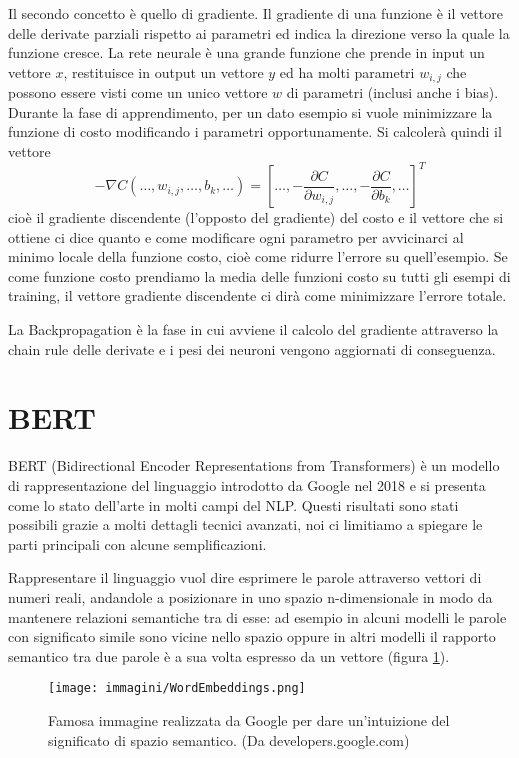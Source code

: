 \documentclass[12pt]{report}
\begin{document}
Il secondo concetto è quello di gradiente. Il gradiente di una funzione è il vettore delle derivate parziali rispetto ai parametri ed indica la direzione verso la quale la funzione cresce. La rete neurale è una grande funzione che prende in input un vettore $x$, restituisce in output un vettore $y$ ed ha molti parametri $w_{i,j}$ che possono essere visti come un unico vettore $w$ di parametri (inclusi anche i bias). Durante la fase di apprendimento, per un dato esempio si vuole minimizzare la funzione di costo modificando i parametri opportunamente. Si calcolerà quindi il vettore $$- \nabla C(\dots,w_{i,j},\dots,b_k,\dots) = [\dots ,- \frac{\partial C}{\partial w_{i,j}}, \dots , - \frac{\partial C}{\partial b_k}, \dots]^T $$ cioè il gradiente discendente (l'opposto del gradiente) del costo e il vettore che si ottiene ci dice quanto e come  modificare ogni parametro per avvicinarci al minimo locale della funzione costo, cioè come ridurre l'errore su quell'esempio. Se come funzione costo prendiamo la media delle funzioni costo su tutti gli esempi di training, il vettore gradiente discendente ci dirà come minimizzare l'errore totale.

La Backpropagation è la fase in cui avviene il calcolo del gradiente attraverso la chain rule delle derivate e i pesi dei neuroni vengono aggiornati di conseguenza.

\section{BERT} 

BERT (Bidirectional Encoder Representations from Transformers) \cite{bert} è un modello di rappresentazione del linguaggio introdotto da Google nel 2018 e si presenta come lo stato dell'arte in molti campi del NLP. Questi risultati sono stati possibili grazie a molti dettagli tecnici avanzati, noi ci limitiamo a spiegare le parti principali con alcune semplificazioni.

Rappresentare il linguaggio vuol dire esprimere le parole attraverso vettori di numeri reali, andandole a posizionare in uno spazio n-dimensionale in modo da mantenere relazioni semantiche tra di esse: ad esempio in alcuni modelli le parole con significato simile sono vicine nello spazio oppure in altri modelli il rapporto semantico tra due parole è a sua volta espresso da un vettore (figura \ref{fig:wordembadding}). 

\begin{figure}[!htb]
\centering
\texttt{[image: immagini/WordEmbeddings.png]}
\caption{\footnotesize{Famosa immagine realizzata da Google per dare un'intuizione del significato di spazio semantico. (Da developers.google.com)}}
\label{fig:wordembadding}
\end{figure}
\end{document}
